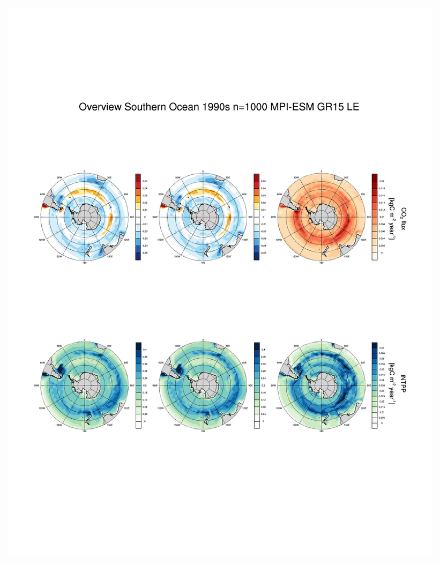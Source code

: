 \begin{figure}[h]
\centering
\includegraphics[scale=.9,trim=7.2cm 15cm 0cm 8cm,clip]{gfx/Overview_SO_co2flux_intpp_ens_t1990s.pdf} %

\end{figure}
